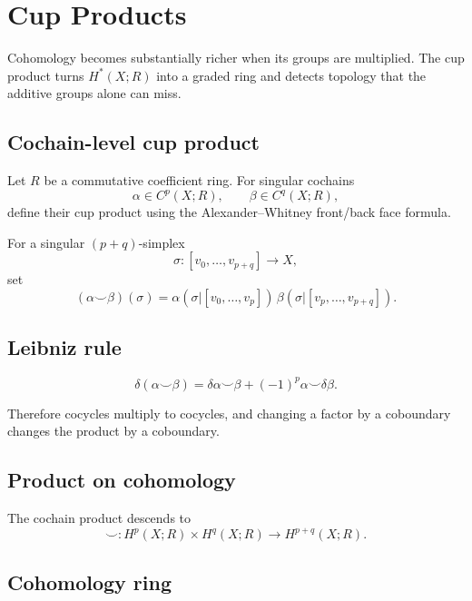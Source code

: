 ﻿\chapter{Cup Products}
\label{ch:viii29-cup-products}

Cohomology becomes substantially richer when its groups are multiplied.
The cup product turns \(H^*(X;R)\) into a graded ring and detects topology that
the additive groups alone can miss.

\section{Cochain-level cup product}

Let \(R\) be a commutative coefficient ring.  For singular cochains
\[
\alpha\in C^p(X;R),
\qquad
\beta\in C^q(X;R),
\]
define their cup product using the Alexander--Whitney front/back face formula.

\begin{definition}
\label{def:viii29-cup}
For a singular \((p+q)\)-simplex
\[
\sigma:[v_0,\dots,v_{p+q}]\to X,
\]
set
\[
(\alpha\smile\beta)(\sigma)
=
\alpha(\sigma|[v_0,\dots,v_p])\,
\beta(\sigma|[v_p,\dots,v_{p+q}]).
\]
\end{definition}

\section{Leibniz rule}

\begin{theorem}
\label{thm:viii29-leibniz}
\[
\delta(\alpha\smile\beta)
=
\delta\alpha\smile\beta
+
(-1)^p\alpha\smile\delta\beta.
\]
\end{theorem}

Therefore cocycles multiply to cocycles, and changing a factor by a coboundary
changes the product by a coboundary.

\section{Product on cohomology}

The cochain product descends to
\[
\smile:
H^p(X;R)\times H^q(X;R)
\to H^{p+q}(X;R).
\]

\section{Cohomology ring}

